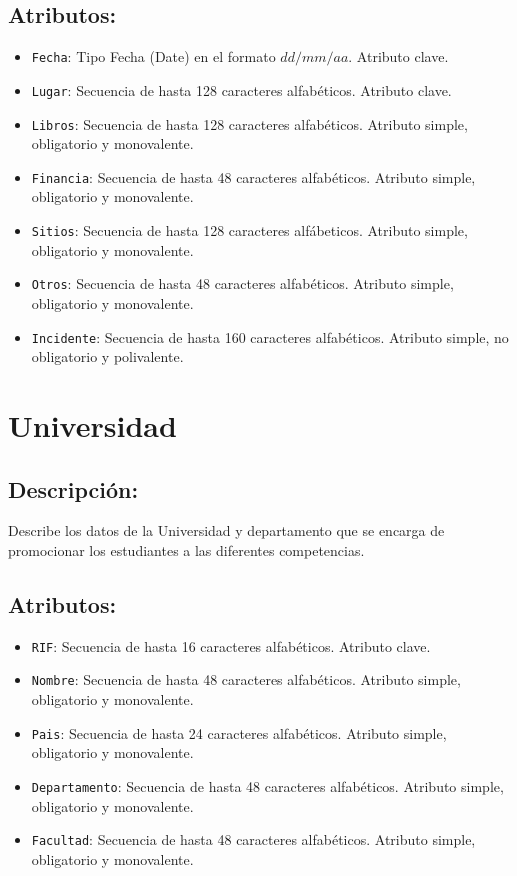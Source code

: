 \documentclass[doc, 12pt, donotrepeattitle]{apa6}
\begin{document}
\subsection*{Atributos:}
\begin{itemize}
\item \texttt{Fecha}: Tipo Fecha (Date) en el formato $dd/mm/aa$. Atributo clave.
\item \texttt{Lugar}: Secuencia de hasta 128 caracteres alfabéticos. Atributo clave.
\item \texttt{Libros}: Secuencia de hasta 128 caracteres alfabéticos. Atributo simple, obligatorio y monovalente.
\item \texttt{Financia}: Secuencia de hasta 48 caracteres alfabéticos. Atributo simple, obligatorio y monovalente.
\item \texttt{Sitios}: Secuencia de hasta 128 caracteres alfábeticos. Atributo simple, obligatorio y monovalente.
\item \texttt{Otros}: Secuencia de hasta 48 caracteres alfabéticos. Atributo simple, obligatorio y monovalente.
\item \texttt{Incidente}: Secuencia de hasta 160 caracteres alfabéticos. Atributo simple, no obligatorio y polivalente.
\end{itemize}

\section*{Universidad}
\subsection*{Descripción:}
Describe los datos de la Universidad y departamento que se encarga de promocionar los estudiantes a las diferentes competencias.

\subsection*{Atributos:}
\begin{itemize}
\item \texttt{RIF}: Secuencia de hasta 16 caracteres alfabéticos. Atributo clave.
\item \texttt{Nombre}: Secuencia de hasta 48 caracteres alfabéticos. Atributo simple, obligatorio y monovalente.
\item \texttt{Pais}: Secuencia de hasta 24 caracteres alfabéticos. Atributo simple, obligatorio y monovalente.
\item \texttt{Departamento}: Secuencia de hasta 48 caracteres alfabéticos. Atributo simple, obligatorio y monovalente.
\item \texttt{Facultad}: Secuencia de hasta 48 caracteres alfabéticos. Atributo simple, obligatorio y monovalente.
\end{itemize}
\end{document}
